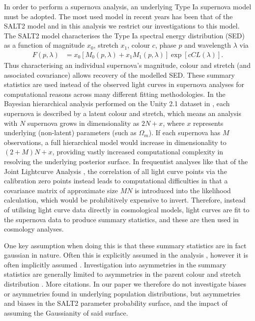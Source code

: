\documentclass[a4paper,fleqn,usenatbib]{mnras}
\newcommand{\red}{\color{red}}
\begin{document}
In order to perform a supernova analysis, an underlying Type Ia supernova model must be adopted. The most used model in recent years has been that of the SALT2 model \citep{GuyAstier2007, GuySullivan2010, MosherGuy2014} and in this analysis we restrict our investigations to this model. The SALT2 model characterises the Type Ia spectral energy distribution (SED) as a function of magnitude $x_0$, stretch $x_1$, colour $c$, phase $p$ and wavelength $\lambda$ via
\begin{align}
F(p,\lambda) &= x_0 \left[ M_0(p,\lambda) + x_1 M_1(p,\lambda)\right] \exp\left[c CL(\lambda)\right].
\end{align} 
Thus characterising an individual supernova's magnitude, colour and stretch (and associated covariance) allows recovery of the modelled SED. These summary statistics are used instead of the observed light curves in supernova analyses for computational reasons across many different fitting methodologies. In the Bayesian hierarchical analysis performed on the Unity 2.1 dataset \citep{SuzukiRubin2012} in \citet{RubinAldering2015}, each supernova is described by a latent colour and stretch, which means an analysis with $N$ supernova grows in dimensionality as $2N + x$, where $x$ represents underlying (non-latent) parameters (such as $\Omega_m$). If each supernova has $M$ observations, a full hierarchical model would increase in dimensionality to $(2+M)N + x$, providing vastly increased computational complexity in resolving the underlying posterior surface. In frequentist analyses like that of the Joint Lightcurve Analysis \citep{BetouleKessler2014}, the correlation of all light curve points via the calibration zero points instead leads to computational difficulties in that a covariance matrix of approximate size $MN$ is introduced into the likelihood calculation, which would be prohibitively expensive to invert. Therefore, instead of utilising light curve data directly in cosmological models, light curves are fit to the supernova data to produce summary statistics, and these are then used in cosmology analyses. 

One key assumption when doing this is that these summary statistics are in fact gaussian in nature. Often this is explicitly assumed in the analysis \citep{MarchTrotta2011, RubinAldering2015}, however it is often implicitly assumed \citep{SullivanGuy2011, SuzukiRubin2012, CampbellDAndrea2013, BetouleKessler2014}. Investigation into asymmetries in the summary statistics are generally limited to asymmetries in the parent colour and stretch distribution \citep{ScolnicRest2014}. {\red More citations.} In our paper we therefore do not investigate biases or asymmetries found in underlying population distributions, but asymmetries and biases in the SALT2 parameter probability surface, and the impact of assuming the Gaussianity of said surface.
\end{document}

